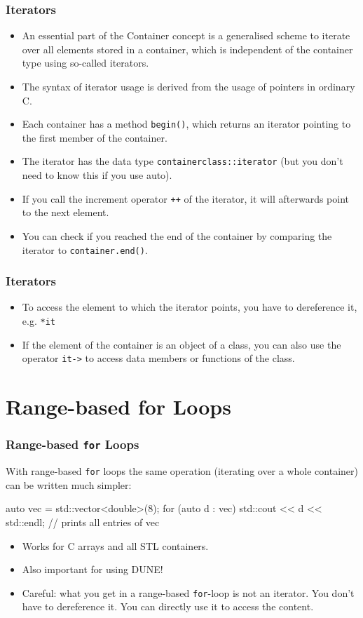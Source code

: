 \documentclass[aspectratio=169,ignorenonframetext,11pt]{beamer}
\def\inline{\lstinline[basicstyle=\small\ttfamily]}
\begin{document}
\begin{frame}
\frametitle{Iterators}
\begin{itemize}
\item An essential part of the Container concept is a generalised scheme to iterate over all elements stored in a container, which is independent of the container type using so-called iterators.
\item The syntax of iterator usage is derived from the usage of pointers in ordinary C.
\item Each container has a method \inline!begin()!, which returns an iterator pointing to the first member of the container.
\item The iterator has the data type \inline!containerclass::iterator! (but you don't need to know this if you use auto).
\item If you call the increment operator \inline!++! of the iterator, it will afterwards point to the next element.
\item You can check if you reached the end of the container by comparing the iterator to \inline!container.end()!.
\end{itemize}
\end{frame}

\begin{frame}
\frametitle<presentation>{Iterators}
\begin{itemize}
\item To access the element to which the iterator points, you have to dereference it, e.g. \inline!*it!
\item If the element of the container is an object of a class, you can also use the operator \inline!it->! to access data members or functions of the class.
\end{itemize}
\begin{codeblock}
  
\end{codeblock}
\end{frame}

\section{Range-based for Loops}

\begin{frame}[fragile]
  \frametitle<presentation>{Range-based \texttt{for} Loops}
  With range-based \inline!for! loops the same operation (iterating over a whole container) can be written much simpler:
  \begin{cppcode}
    auto vec = std::vector<double>(8);
    for (auto d : vec)
      std::cout << d << std::endl; // prints all entries of vec
  \end{cppcode}
  \begin{itemize}
  \item Works for C arrays and all STL containers.
  \item Also important for using DUNE!
  \item Careful: what you get in a range-based \inline!for!-loop is not an iterator. You don't have to dereference it. You can directly use it to access the content.
  \end{itemize}
\end{frame}
\end{document}
